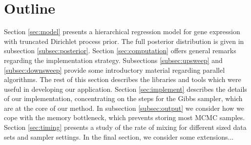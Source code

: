 \section{Outline}
Section \ref{sec:model} presents a hierarchical regression model for gene expression with truncated Dirichlet process prior. The full posterior distribution is given in subsection \ref{subsec:posterior}. Section \ref{sec:computation} offers general remarks regarding the implementation strategy. Subsections \ref{subsec:upsweep} and \ref{subsec:downsweep} provide some introductory material regarding parallel algorithms. The rest of this section describes the libraries and tools which were useful in developing our application. Section \ref{sec:implement} describes the details of our implementation, concentrating on the steps for the Gibbs sampler, which are at the core of our method. In subsection \ref{subsec:output} we consider how we cope with the memory bottleneck, which prevents storing most MCMC samples. Section \ref{sec:timing} presents a study of the rate of mixing for different sized data sets and sampler settings. In the final section, we consider some extensions...

